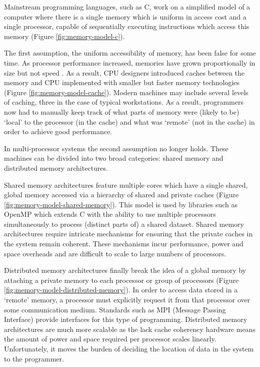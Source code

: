 			
			Mainstream programming languages, such as C, work on a simplified model of
			a computer where there is a single memory which is uniform in access cost
			and a single processor, capable of sequentially executing instructions
			which access this memory (Figure \ref{fig:memory-model-c}).
			
			The first assumption, the uniform accessibility of memory, has been false
			for some time. As processor performance increased, memories have grown
			proportionally in size but not speed \cite{wilkes01}. As a result, CPU
			designers introduced caches between the memory and CPU implemented with
			smaller but faster memory technologies (Figure
			\ref{fig:memory-model-cache}). Modern machines may include several levels
			of caching, three in the case of typical workstations. As a result,
			programmers now had to manually keep track of what parts of memory were
			(likely to be) `local' to the processor (in the cache) and what was
			`remote' (not in the cache) in order to achieve good performance.
			
			In multi-processor systems the second assumption no longer holds. These
			machines can be divided into two broad categories: shared memory and
			distributed memory architectures.
			
			Shared memory architectures feature multiple cores which have a single
			shared, global memory accessed via a hierarchy of shared and private
			caches (Figure \ref{fig:memory-model-shared-memory}). This model is used
			by libraries such as OpenMP\cite{openmp} which extends C with the ability
			to use multiple processors simultaneously to process (distinct parts of) a
			shared dataset. Shared memory architectures require intricate mechanisms
			for ensuring that the private caches in the system remain coherent. These
			mechanisms incur performance, power and space overheads and are difficult
			to scale to large numbers of processors.
			
			Distributed memory architectures finally break the idea of a global memory
			by attaching a private memory to each processor or group of processors
			(Figure \ref{fig:memory-model-distributed-memory}). In order to access
			data stored in a `remote' memory, a processor must explicitly request it
			from that processor over some communication medium. Standards such as MPI
			(Message Passing Interface) provide interfaces for this type of
			programming. Distributed memory architectures are much more scalable as
			the lack cache coherency hardware means the amount of power and space
			required per processor scales linearly. Unfortunately, it moves the burden
			of deciding the location of data in the system to the programmer.
			
